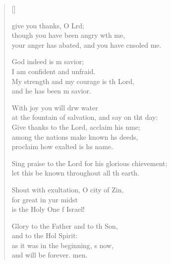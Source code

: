 \settowidth{\versewidth}{Sing praise to the Lord for his glorious achievement; *}
\begin{verse}[\versewidth]
  \begin{patverse}
     give you thanks, O Lrd;\Flex\\
though you have been angry w\pointup{\i}th me,\Med\\
your anger has abated, and you have cnsoled me.

God indeed is m savior;\Med\\
I am confident and unfraid.\\
My strength and my courage is th Lord,\Med\\
and he has been m savior.

With joy you will drw water\Med\\
at the fountain of salvation, and say on tht day:\\
Give thanks to the Lord, acclaim his nme;\Flex\\
among the nations make known h\pointup{\i}s deeds,\Med\\
proclaim how exalted is h\pointup{\i}s name.

Sing praise to the Lord for his glorious chievement;\Med\\
let this be known throughout all th earth.

Shout with exultation, O city of Zin,\Flex\\
for great in yur midst\Med\\
is the Holy One f Israel!

Glory to the Father and to th Son,\Med\\
and to the Hol Spirit:\\
as it was in the beginning, \pointup{\i}s now,\Med\\
and will be forever. men. 
  \end{patverse}
\end{verse}
